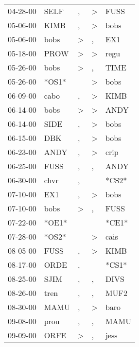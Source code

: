 \begin{supertabular}{lllll}
 04-28-00 &   SELF &                , &     \textgreater &   FUSS \\
 05-06-00 &   KIMB &                , &     \textgreater &   bobs \\
 05-06-00 &   bobs &     \textgreater &                , &    EX1 \\
 05-18-00 &   PROW &     \textgreater &     \textgreater &   regu \\
 05-26-00 &   bobs &     \textgreater &                , &   TIME \\
 05-26-00 &  *OS1* &                  &     \textgreater &   bobs \\
 06-09-00 &   cabo &                , &     \textgreater &   KIMB \\
 06-14-00 &   bobs &     \textgreater &     \textgreater &   ANDY \\
 06-14-00 &   SIDE &                , &     \textgreater &   bobs \\
 06-15-00 &    DBK &                , &     \textgreater &   bobs \\
 06-23-00 &   ANDY &                , &     \textgreater &   crip \\
 06-25-00 &   FUSS &                , &                , &   ANDY \\
 06-30-00 &   chvr &                , &                  &  *CS2* \\
 07-10-00 &    EX1 &                , &     \textgreater &   bobs \\
 07-10-00 &   bobs &     \textgreater &                , &   FUSS \\
 07-22-00 &  *OE1* &                  &                  &  *CE1* \\
 07-28-00 &  *OS2* &                  &     \textgreater &   cais \\
 08-05-00 &   FUSS &                , &     \textgreater &   KIMB \\
 08-17-00 &   ORDE &                , &                  &  *CS1* \\
 08-25-00 &   SJIM &                , &                , &   DIVS \\
 08-26-00 &   tren &                , &                , &   MUF2 \\
 08-30-00 &   MAMU &                , &     \textgreater &   baro \\
 09-08-00 &   prou &                , &                , &   MAMU \\
 09-09-00 &   ORFE &     \textgreater &                , &   jess \\

\end{supertabular}
